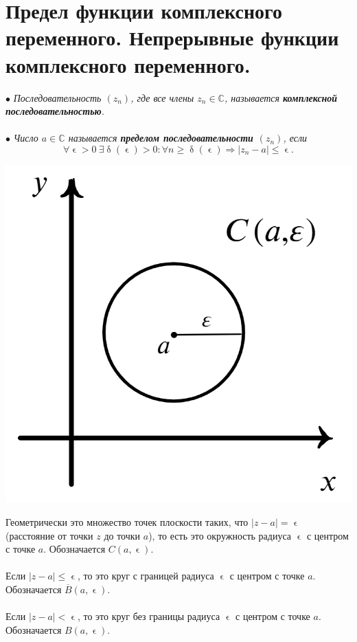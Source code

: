 \documentclass[a4paper, 12pt]{article}
\newcommand{\Cm}{\mathbb{C}}
\renewcommand{\leq}{\leqslant}
\renewcommand{\delta}{\updelta}
\renewcommand{\epsilon}{\upvarepsilon}
\newcommand{\limdef}{\forall \epsilon >0\ \exists \delta (\epsilon) > 0}
\begin{document}
\section{Предел функции комплексного переменного. Непрерывные функции комплексного переменного.}
$\bullet$ \textit{Последовательность $(z_n)$, где все члены $z_n \in \Cm$, называется \textbf{комплексной последовательностью}.}\\\\
$\bullet$ \textit{Число $a\in \Cm$ называется \textbf{пределом последовательности $(z_n)$}, если} $$\limdef : \forall n \geqslant \delta (\epsilon) \Rightarrow |z_n - a | \leq \epsilon.$$
\noindent
\parbox[b][4.5cm][t]{10mm}{
	\includegraphics[scale=0.4]{images/009.png}}
\hfill
\parbox[b][4cm][t]{110mm}{Геометрически это множество точек плоскости таких, что $|z-a| = \epsilon$ (расстояние от точки $z$ до точки $a$), то есть это окружность радиуса $\epsilon$ с центром с точке $a$. Обозначается $C(a,\epsilon)$.\\\\Если $|z-a|\leqslant \epsilon$, то это круг с границей радиуса $\epsilon$ с центром с точке $a$. Обозначается $\overline{B}(a,\epsilon)$.\\\\
	Если $|z-a|< \epsilon$, то это круг без границы радиуса $\epsilon$ с центром с точке $a$. Обозначается ${B}(a,\epsilon)$.}\\\\
\end{document}
